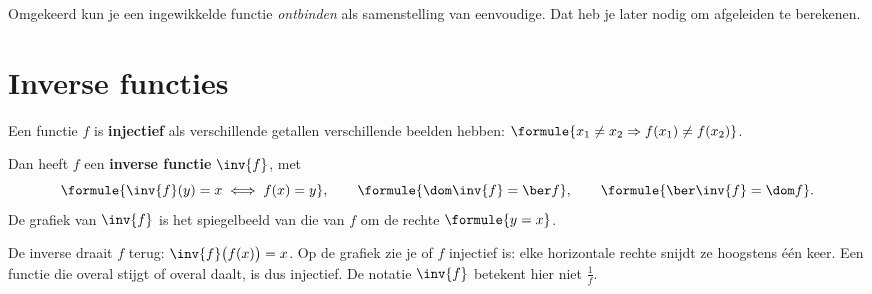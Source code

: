 \begin{oefeningen}

\end{oefeningen}

Omgekeerd kun je een ingewikkelde functie \textit{ontbinden} als samenstelling van eenvoudige. Dat heb je later nodig om afgeleiden te berekenen.


\begin{oefeningen}

\end{oefeningen}

\section{Inverse functies}

\begin{theorie}
Een functie $f$ is \textbf{\textcolor{accent}{injectief}} als verschillende getallen verschillende beelden hebben: $\formule{x_1 \neq x_2 \Rightarrow f(x_1) \neq f(x_2)}$.

Dan heeft $f$ een \textbf{\textcolor{accent}{inverse functie}} $\inv{f}$, met
\[\formule{\inv{f}(y) = x \iff f(x) = y}, \qquad \formule{\dom \inv{f} = \ber f}, \qquad \formule{\ber \inv{f} = \dom f}.\]
De grafiek van $\inv{f}$ is het spiegelbeeld van die van $f$ om de rechte $\formule{y = x}$.
\end{theorie}

De inverse draait $f$ terug: $\inv{f}\bigl(f(x)\bigr) = x$. Op de grafiek zie je of $f$ injectief is: elke horizontale rechte snijdt ze hoogstens één keer. Een functie die overal stijgt of overal daalt, is dus injectief. De notatie $\inv{f}$ betekent hier niet $\frac{1}{f}$.


